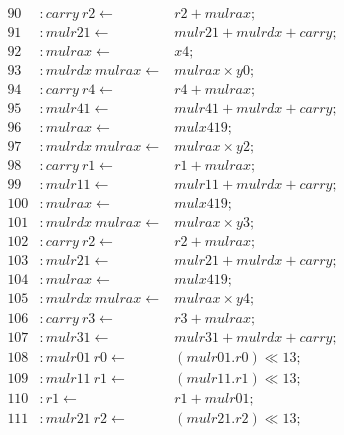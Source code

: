 {\begin{align*}
90 &: \mathit{carry}\ \mathit{r2} \leftarrow & \mathit{r2} + \mathit{mulrax}; \\
91 &: \mathit{mulr21} \leftarrow & \mathit{mulr21} + \mathit{mulrdx} + \mathit{carry}; \\
92 &: \mathit{mulrax} \leftarrow & \mathit{x4}; \\
93 &: \mathit{mulrdx}\ \mathit{mulrax} \leftarrow & \mathit{mulrax} \times \mathit{y0}; \\
94 &: \mathit{carry}\ \mathit{r4} \leftarrow & \mathit{r4} + \mathit{mulrax}; \\
95 &: \mathit{mulr41} \leftarrow & \mathit{mulr41} + \mathit{mulrdx} + \mathit{carry}; \\
96 &: \mathit{mulrax} \leftarrow & \mathit{mulx419}; \\
97 &: \mathit{mulrdx}\ \mathit{mulrax} \leftarrow & \mathit{mulrax} \times \mathit{y2}; \\
98 &: \mathit{carry}\ \mathit{r1} \leftarrow & \mathit{r1} + \mathit{mulrax}; \\
99 &: \mathit{mulr11} \leftarrow & \mathit{mulr11} + \mathit{mulrdx} + \mathit{carry}; \\
100 &: \mathit{mulrax} \leftarrow & \mathit{mulx419}; \\
101 &: \mathit{mulrdx}\ \mathit{mulrax} \leftarrow & \mathit{mulrax} \times \mathit{y3}; \\
102 &: \mathit{carry}\ \mathit{r2} \leftarrow & \mathit{r2} + \mathit{mulrax}; \\
103 &: \mathit{mulr21} \leftarrow & \mathit{mulr21} + \mathit{mulrdx} + \mathit{carry}; \\
104 &: \mathit{mulrax} \leftarrow & \mathit{mulx419}; \\
105 &: \mathit{mulrdx}\ \mathit{mulrax} \leftarrow & \mathit{mulrax} \times \mathit{y4}; \\
106 &: \mathit{carry}\ \mathit{r3} \leftarrow & \mathit{r3} + \mathit{mulrax}; \\
107 &: \mathit{mulr31} \leftarrow & \mathit{mulr31} + \mathit{mulrdx} + \mathit{carry}; \\
108 &: \mathit{mulr01}\ \mathit{r0} \leftarrow & (\mathit{mulr01}.\mathit{r0}) \ll 13; \\
109 &: \mathit{mulr11}\ \mathit{r1} \leftarrow & (\mathit{mulr11}.\mathit{r1}) \ll 13; \\
110 &: \mathit{r1} \leftarrow & \mathit{r1} + \mathit{mulr01}; \\
111 &: \mathit{mulr21}\ \mathit{r2} \leftarrow & (\mathit{mulr21}.\mathit{r2}) \ll 13; \\

\end{align*}}
